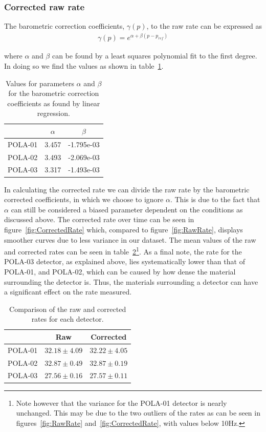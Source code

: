 \documentclass[12pt,a4paper]{amsart}
\begin{document}
\subsubsection{Corrected raw rate}
The barometric correction coefficients, $\gamma(p)$, to the raw rate can be expressed as
\begin{align}
\gamma(p) = e^{\alpha + \beta(p-p_{ref})}
\end{align}

where $\alpha$ and $\beta$ can be found by a least squares polynomial fit to the first degree. In doing so we find the values as shown in table~\ref{tab:alpha_beta}.

\begin{table}[]
\caption{Values for parameters $\alpha$ and $\beta$ for the barometric correction coefficients as found by linear regression.}
\label{tab:alpha_beta}
\begin{tabular}{c|cc}
\hline\hline
        & $\alpha$ & $\beta$    \\ \hline
POLA-01 & 3.457    & -1.795e-03 \\
POLA-02 & 3.493    & -2.069e-03 \\
POLA-03 & 3.317    & -1.493e-03 \\
\hline\hline
\end{tabular}
\end{table}

In calculating the corrected rate we can divide the raw rate by the barometric corrected coefficients, in which we choose to ignore $\alpha$. This is due to the fact that $\alpha$ can still be considered a biased parameter dependent on the conditions as discussed above. The corrected rate over time can be seen in figure~\ref{fig:CorrectedRate} which, compared to figure~\ref{fig:RawRate}, displays smoother curves due to less variance in our dataset. The mean values of the raw and corrected rates can be seen in table~\ref{tab:raw_vs_corrected}\footnote{Note however that the variance for the POLA-01 detector is nearly unchanged. This may be due to the two outliers of the rates as can be seen in figures~\ref{fig:RawRate} and~\ref{fig:CorrectedRate}, with values below 10Hz.}. As a final note, the rate for the POLA-03 detector, as explained above, lies systematically lower than that of POLA-01, and POLA-02, which can be caused by how dense the material surrounding the detector is. Thus, the materials surrounding a detector can have a significant effect on the rate measured.

\begin{table}[]
\caption{Comparison of the raw and corrected rates for each detector.}
\label{tab:raw_vs_corrected}
\begin{tabular}{c|cc}
\hline\hline
        & Raw             & Corrected       \\ \hline
POLA-01 & $32.18\pm4.09$  & $32.22\pm 4.05$ \\
POLA-02 & $32.87\pm0.49$  & $32.87\pm 0.19$ \\
POLA-03 & $27.56\pm 0.16$ & $27.57\pm 0.11$ \\
\hline\hline
\end{tabular}
\end{table}
\end{document}
